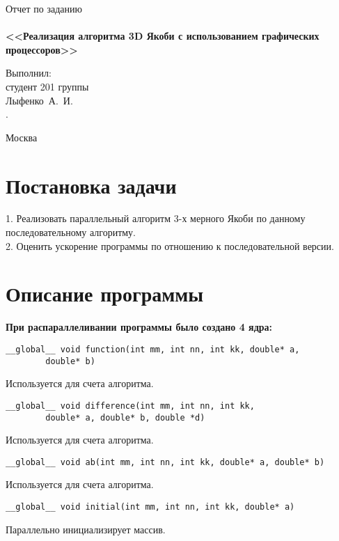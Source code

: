 \documentclass[a4paper,12pt,titlepage,draft]{article}
\begin{document}
\begin{titlepage}
    \begin{center}
	{\Large \sc Отчет по заданию}\\
	~\\
	{\large \bf <<Реализация алгоритма 3D Якоби с использованием графических процессоров>>}\\ 
    \end{center}
    \begin{flushright}
	\vfill {Выполнил:\\
	студент 201 группы\\
	Лыфенко~А.~И.\\.}
    \end{flushright}
    \begin{center}
	\vfill
	{\small Москва\\ \the\year{}}
    \end{center}
\end{titlepage}

\section{Постановка задачи}
1. Реализовать параллельный алгоритм 3-х мерного Якоби по данному последовательному алгоритму.\\

2. Оценить ускорение программы по отношению к последовательной версии.\\
\newpage
\section{Описание программы}
\textbf{При распараллеливании программы было создано 4 ядра:}\\
\begin{verbatim}
__global__ void function(int mm, int nn, int kk, double* a, 
        double* b)
\end{verbatim}
Используется для счета алгоритма.
\begin{verbatim}
__global__ void difference(int mm, int nn, int kk, 
        double* a, double* b, double *d)
\end{verbatim}
Используется для счета алгоритма.
\begin{verbatim}
__global__ void ab(int mm, int nn, int kk, double* a, double* b)
\end{verbatim}
Используется для счета алгоритма.
\begin{verbatim}
__global__ void initial(int mm, int nn, int kk, double* a)
\end{verbatim}
Параллельно инициализирует массив.\\
\end{document}
